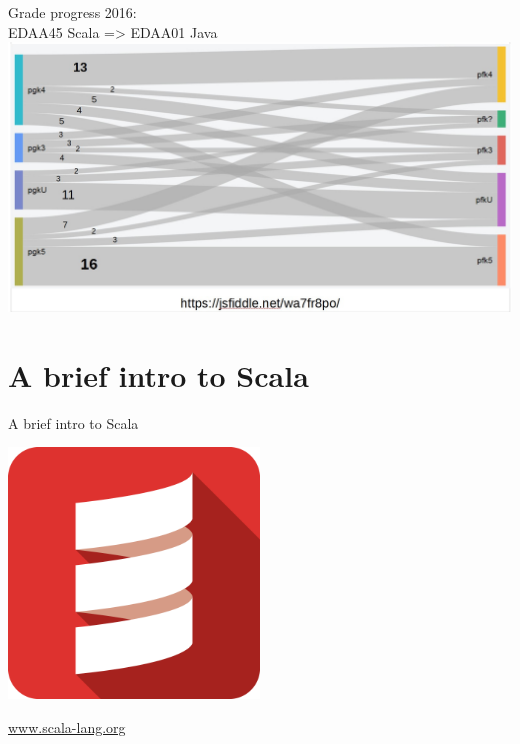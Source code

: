 \documentclass{lecturenotes}
\begin{document}
\begin{Slide}{Grade progress 2016:\\EDAA45 Scala => EDAA01 Java}
\includegraphics[width=1.05\textwidth]{img/2016}
\end{Slide}



\section{A brief intro to Scala}

\begin{Slide}{A brief intro to Scala}
\begin{multicols}{2}
\includegraphics[width=0.5\textwidth]{../../img/scala-icon}

\columnbreak

\hfill\url{www.scala-lang.org}

\end{multicols}
\end{Slide}
\end{document}
